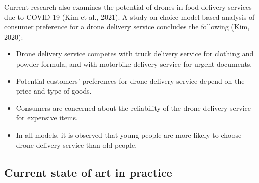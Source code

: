\documentclass[
]{book}
\providecommand{\tightlist}{%
  \setlength{\itemsep}{0pt}\setlength{\parskip}{0pt}}
\begin{document}
Current research also examines the potential of drones in food delivery services due to COVID-19 (Kim et al., 2021). A study on choice-model-based analysis of consumer preference for a drone delivery service concludes the following (Kim, 2020):

\begin{itemize}
\tightlist
\item
  Drone delivery service competes with truck delivery service for clothing and powder formula, and with motorbike delivery service for urgent documents.
\item
  Potential customers' preferences for drone delivery service depend on the price and type of goods.
\item
  Consumers are concerned about the reliability of the drone delivery service for expensive items.
\item
  In all models, it is observed that young people are more likely to choose drone delivery service than old people.
\end{itemize}

\hypertarget{current-state-of-art-in-practice-33}{%
\subsection*{Current state of art in practice}\label{current-state-of-art-in-practice-33}}
\end{document}
